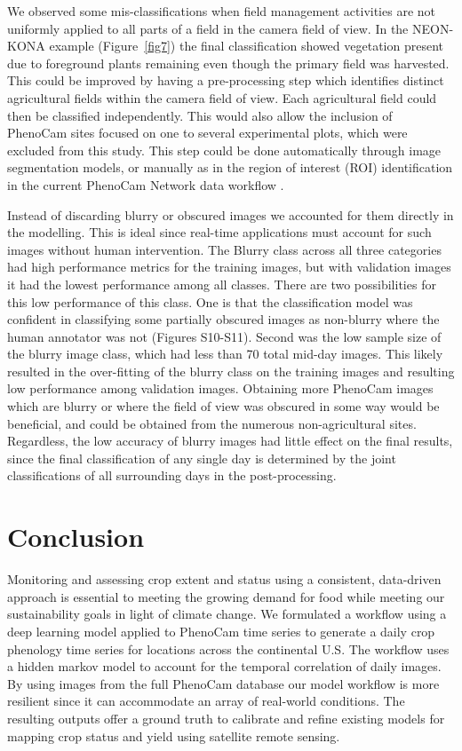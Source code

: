 \documentclass[remotesensing,article,submit,moreauthors,pdftex]{Definitions/mdpi}
\begin{document}
We observed some mis-classifications when field management activities are not uniformly applied to all parts of a field in the camera field of view. In the NEON-KONA example (Figure~\ref{fig7}) the final classification showed vegetation present due to foreground plants remaining even though the primary field was harvested. This could be improved by having a pre-processing step which identifies distinct agricultural fields within the camera field of view. Each agricultural field could then be classified independently. This would also allow the inclusion of PhenoCam sites focused on one to several experimental plots, which were excluded from this study. This step could be done automatically through image segmentation models, or manually as in the region of interest (ROI) identification in the current PhenoCam Network data workflow \citep{richardson2018a}.

Instead of discarding blurry or obscured images we accounted for them directly in the modelling. This is ideal since real-time applications must account for such images without human intervention. The Blurry class across all three categories had high performance metrics for the training images, but with validation images it had the lowest performance among all classes. There are two possibilities for this low performance of this class. One is that the classification model was confident in classifying some partially obscured images as non-blurry where the human annotator was not (Figures S10-S11). Second was the low sample size of the blurry image class, which had less than 70 total mid-day images. This likely resulted in the over-fitting of the blurry class on the training images and resulting low performance among validation images. Obtaining more PhenoCam images which are blurry or where the field of view was obscured in some way would be beneficial, and could be obtained from the numerous non-agricultural sites. Regardless, the low accuracy of blurry images had little effect on the final results, since the final classification of any single day is determined by the joint classifications of all surrounding days in the post-processing. 

\section{Conclusion}

Monitoring and assessing crop extent and status using a consistent, data-driven approach is essential to meeting the growing demand for food while meeting our sustainability goals in light of climate change. We formulated a workflow using a deep learning model applied to PhenoCam time series to generate a daily crop phenology time series for locations across the continental U.S. The workflow uses a hidden markov model to account for the temporal correlation of daily images. By using images from the full PhenoCam database our model workflow is more resilient since it can accommodate an array of real-world conditions. The resulting outputs offer a ground truth to calibrate and refine existing models for mapping crop status and yield using satellite remote sensing. 
\end{document}
